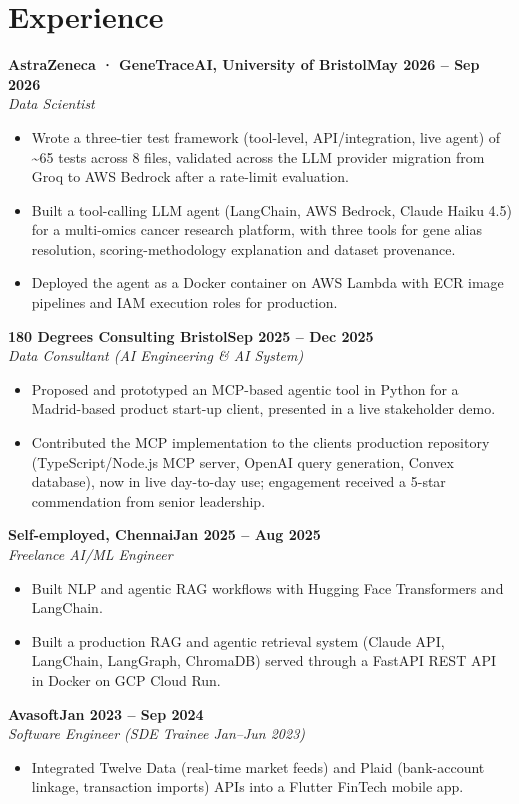 \documentclass[a4paper,10pt]{article}
\newcommand{\entry}[4]{\noindent\textbf{#1}\hfill\textbf{#2}\\ \textit{#3}\hfill\textit{#4}\par}
\begin{document}
\section{Experience}
\entry{AstraZeneca · GeneTraceAI, University of Bristol}{May 2026 – Sep 2026}{Data Scientist}{}
\begin{itemize}
  \item Wrote a three-tier test framework (tool-level, API/integration, live agent) of \textasciitilde{}65 tests across 8 files, validated across the LLM provider migration from Groq to AWS Bedrock after a rate-limit evaluation.
  \item Built a tool-calling LLM agent (LangChain, AWS Bedrock, Claude Haiku 4.5) for a multi-omics cancer research platform, with three tools for gene alias resolution, scoring-methodology explanation and dataset provenance.
  \item Deployed the agent as a Docker container on AWS Lambda with ECR image pipelines and IAM execution roles for production.
\end{itemize}
\vspace{3pt}
\entry{180 Degrees Consulting Bristol}{Sep 2025 – Dec 2025}{Data Consultant (AI Engineering \& AI System)}{}
\begin{itemize}
  \item Proposed and prototyped an MCP-based agentic tool in Python for a Madrid-based product start-up client, presented in a live stakeholder demo.
  \item Contributed the MCP implementation to the client\textquotesingle{}s production repository (TypeScript/Node.js MCP server, OpenAI query generation, Convex database), now in live day-to-day use; engagement received a 5-star commendation from senior leadership.
\end{itemize}
\vspace{3pt}
\entry{Self-employed, Chennai}{Jan 2025 – Aug 2025}{Freelance AI/ML Engineer}{}
\begin{itemize}
  \item Built NLP and agentic RAG workflows with Hugging Face Transformers and LangChain.
  \item Built a production RAG and agentic retrieval system (Claude API, LangChain, LangGraph, ChromaDB) served through a FastAPI REST API in Docker on GCP Cloud Run.
\end{itemize}
\vspace{3pt}
\entry{Avasoft}{Jan 2023 – Sep 2024}{Software Engineer (SDE Trainee Jan–Jun 2023)}{}
\begin{itemize}
  \item Integrated Twelve Data (real-time market feeds) and Plaid (bank-account linkage, transaction imports) APIs into a Flutter FinTech mobile app.
\end{itemize}
\end{document}
